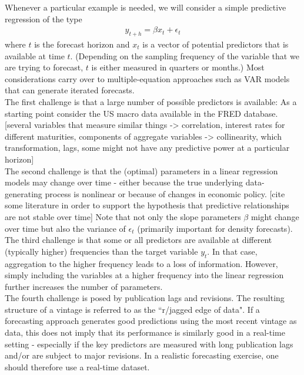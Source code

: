 \documentclass[12pt,a4paper]{scrartcl}
\begin{document}
Whenever a particular example is needed, we will consider a simple predictive regression of the type 
\begin{align*}
y_{t+h} = \beta x_t + \epsilon_t
\end{align*}
where $t$ is the forecast horizon and $x_t$ is a vector of potential predictors that is available at time $t$. (Depending on the sampling frequency of the variable that we are trying to forecast, $t$ is either measured in quarters or months.) Most considerations carry over to multiple-equation approaches such as VAR models that can generate iterated forecasts.\\

The first challenge is that a large number of possible predictors is available: As a starting point consider the US macro data available in the FRED database. [several variables that measure similar things -> correlation, interest rates for different maturities, components of aggregate variables -> collinearity, which transformation, lags, some might not have any predictive power at a particular horizon]\\

The second challenge is that the (optimal) parameters in a linear regression models may change over time - either because the true underlying data-generating process is nonlinear or because of changes in economic policy. [cite some literature in order to support the hypothesis that predictive relationships are not stable over time] Note that not only the slope parameters $\beta$ might change over time but also the variance of $\epsilon_t$ (primarily important for density forecasts).\\

The third challenge is that some or all predictors are available at different (typically higher) frequencies than the target variable $y_t$. In that case, aggregation to the higher frequency leads to a loss of information. However, simply including the variables at a higher frequency into the linear regression further increases the number of parameters.\\

The fourth challenge is posed by publication lags and revisions. The resulting structure of a vintage is referred to as the ``r/jagged edge of data". If a forecasting approach generates good predictions using the most recent vintage as data, this does not imply that its performance is similarly good in a real-time setting - especially if the key predictors are measured with long publication lags and/or are subject to major revisions. In a realistic forecasting exercise, one should therefore use a real-time dataset.\\
\end{document}
